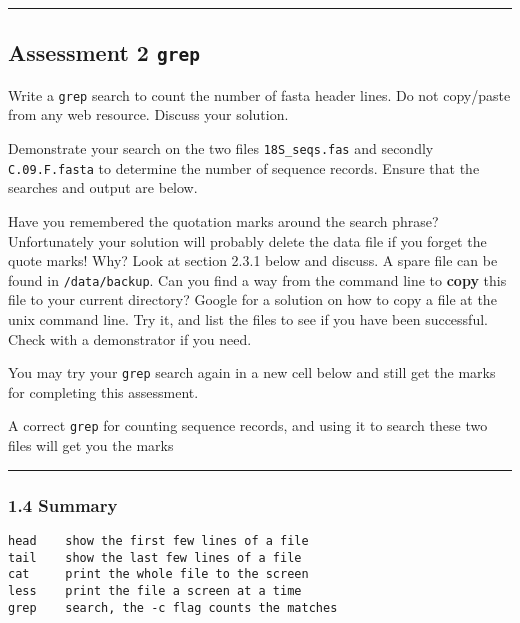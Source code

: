 \documentclass[11pt]{article}
\begin{document}
    \begin{center}\rule{0.5\linewidth}{\linethickness}\end{center}

\hypertarget{assessment-2-grep}{%
\subsection{\texorpdfstring{Assessment 2
\texttt{grep}}{Assessment 2 grep}}\label{assessment-2-grep}}

Write a \texttt{grep} search to count the number of fasta header lines.
Do not copy/paste from any web resource. Discuss your solution.

    Demonstrate your search on the two files \texttt{18S\_seqs.fas} and
secondly \texttt{C.09.F.fasta} to determine the number of sequence
records. Ensure that the searches and output are below.

    Have you remembered the quotation marks around the search phrase?
Unfortunately your solution will probably delete the data file if you
forget the quote marks! Why? Look at section 2.3.1 below and discuss. A
spare file can be found in \texttt{/data/backup}. Can you find a way
from the command line to \textbf{copy} this file to your current
directory? Google for a solution on how to copy a file at the unix
command line. Try it, and list the files to see if you have been
successful. Check with a demonstrator if you need.

You may try your \texttt{grep} search again in a new cell below and
still get the marks for completing this assessment.

    A correct \texttt{grep} for counting sequence records, and using it to
search these two files will get you the marks

    \begin{center}\rule{0.5\linewidth}{\linethickness}\end{center}

    \hypertarget{summary}{%
\subsubsection{1.4 Summary}\label{summary}}

\begin{verbatim}
head    show the first few lines of a file
tail    show the last few lines of a file
cat     print the whole file to the screen
less    print the file a screen at a time
grep    search, the -c flag counts the matches
\end{verbatim}
\end{document}

